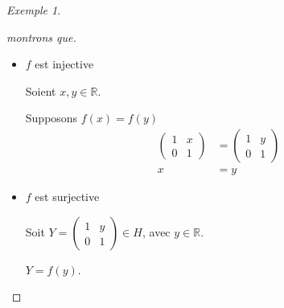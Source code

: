 \documentclass{report}
\theoremstyle{definition}
\theoremstyle{remark}
\newtheorem*{exem}{Exemple}
\begin{document}
\begin{exem}
\begin{enumerate}[label=(\arabic*)]
\begin{proof}[montrons que]
				\begin{itemize}
					\item $f$ est injective

					Soient $x,y \in \mathbb{R}$.

					Supposons $f(x)=f(y)$
					\begin{align*}
						\begin{pmatrix}
							1&x\\0&1
						\end{pmatrix}&= \begin{pmatrix}
							1&y\\0&1
						\end{pmatrix}\\
						x&= y
					\end{align*}
					\item $f$ est surjective

					Soit $Y = \begin{pmatrix}
						1&y\\0&1
					\end{pmatrix} \in H$, avec $y \in \mathbb{R}$.

					$Y = f(y)$.
				\end{itemize}
			\end{proof}
		\end{enumerate}
	\end{exem}
\end{document}
